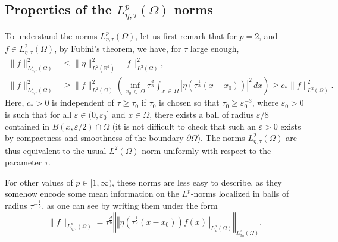 \documentclass[AHL,Unicode,longabstracts]{cedram}
\newcommand*\R{\mathbb{R}}
\newcommand{\norm}[1]{\left\Vert#1\right\Vert}
\renewcommand{\leq}{\leqslant}
\renewcommand{\geq}{\geqslant}
\begin{document}

\subsection*{Properties of the $L^p_{\eta, \tau}(\Omega)$ norms}


To understand the norms $L^{p}_{\eta,\tau}(\Omega)$, let us first remark that for $p = 2$, and $f \in L^2_{\eta, \tau} (\Omega)$, by Fubini's theorem, we have, for $\tau$ large enough,
\begin{align*}
\| f \|_{L^2_{\eta, \tau}(\Omega)}^2 &\leq \|\eta\|_{L^2(\R^d)}^2 \| f\|_{L^2(\Omega)}^2,
\\
 \| f \|_{L^2_{\eta, \tau}(\Omega)}^2
&\geq \| f \|_{L^2(\Omega)}^2
\left(
\inf_{x_0\,\in\,\Omega} \tau^{\frac{d}{3}} \int_{x\,\in \,\Omega} \left|\eta\left(\tau^{\frac{1}{3}} (x -x_0)\right)\right|^2 \, dx
\right)
\geq c_* \| f\|_{L^2(\Omega)}^2.
\end{align*}
Here, $c_*>0$ is independent of $\tau \geq \tau_0$ if $\tau_0$ is chosen so that $\tau_0 \geq \varepsilon_0^{-3}$, where $\varepsilon_0 >0$ is such that for all $\varepsilon \in (0, \varepsilon_0]$ and $x \in \Omega$, there exists a ball of radius $\varepsilon/8$ contained in $B(x, \varepsilon/2) \cap \Omega$ (it is not difficult to check that such an $\varepsilon>0$ exists by compactness and smoothness of the boundary $\partial \Omega$). The norms $L^2_{\eta, \tau}(\Omega)$ are thus equivalent to the usual $L^2(\Omega)$ norm uniformly with respect to the parameter $\tau$.


For other values of $p \in [1, \infty)$, these norms are less easy to describe, as they somehow encode some mean information on the $L^p$-norms localized in balls of radius $\tau^{-\frac{1}{3}}$, as one can see by writing them under the form
\pagebreak
\[
\| f \|_{L^{p}_{\eta,\tau}(\Omega)} = \tau^{\frac{d}{6}} \norm{\norm{ \eta\left(\tau^{\frac{1}{3}} (x - x_0)\right) f(x) }_{L^p_x(\Omega)}}_{L^2_{x_0} (\Omega)}.
\]
\end{document}
